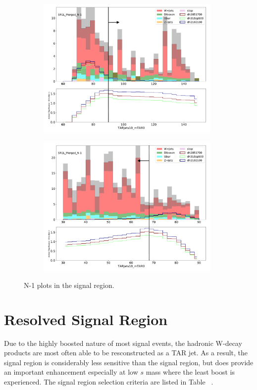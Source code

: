 \begin{figure}[htbp]
\begin{subfigure}{0.49\textwidth}
     \includegraphics[width = 0.98\textwidth]{Figures/4/N1m/TARJets10_mTAR0.pdf}
     \caption{\mTAR}
     \end{subfigure}
     \begin{subfigure}{0.49\textwidth}
     \includegraphics[width = 0.98\textwidth]{Figures/4/N1m/TARJets10_mTAR02.pdf}
     \caption{\mTAR}
     \end{subfigure}

     \caption{N-1 plots in the \merged signal region.}
     \label{fig:SRN1}
  \end{figure}

\section{Resolved Signal Region}
Due to the highly boosted nature of most signal events, the hadronic W-decay products are most often able to be resconstructed as a TAR jet. As a result, the \resolved signal region is considerably less sensitive than the \merged signal region, but does provide an important enhancement especially at low $s$ mass where the least boost is experienced. The \resolved signal region selection criteria are listed in Table ~.

